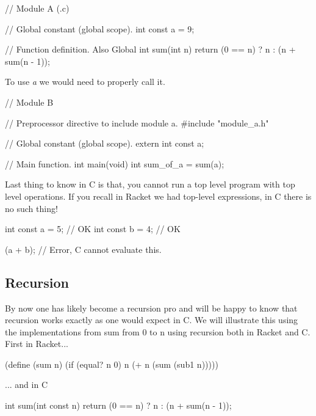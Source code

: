 \begin{code}[C]
// Module A (.c)

// Global constant (global scope).
int const a = 9;

// Function definition.  Also Global
int sum(int n) 
{
	return (0 == n) ? n : (n + sum(n - 1));
}
\end{code}

To use \emph{a} we would need to properly call it.\\

\begin{code}[C]
// Module B

// Preprocessor directive to include module a.
#include "module_a.h"

// Global constant (global scope).
extern int const a;

// Main function.
int main(void)
{
	int sum_of_a = sum(a);	
}
\end{code}

Last thing to know in C is that, you cannot run a top level program with top level operations.  If you recall in Racket we had top-level expressions, in C there is no such thing!\\

\begin{code}[C]
int const a = 5; // OK
int const b = 4; // OK

(a + b); // Error, C cannot evaluate this.
\end{code}


\subsection{Recursion}

By now one has likely become a recursion pro and will be happy to know that recursion works exactly as one would expect in C.  We will illustrate this using the implementations from sum from 0 to n using recursion both in Racket and C.\\

First in Racket...\\
\begin{code}[Lisp]
(define (sum n)
	(if (equal? n 0) n (+ n (sum (sub1 n)))))
\end{code}

... and in C\\
\begin{code}[C]
int sum(int const n)
{
	return (0 == n) ? n : (n + sum(n - 1));
}
\end{code}

